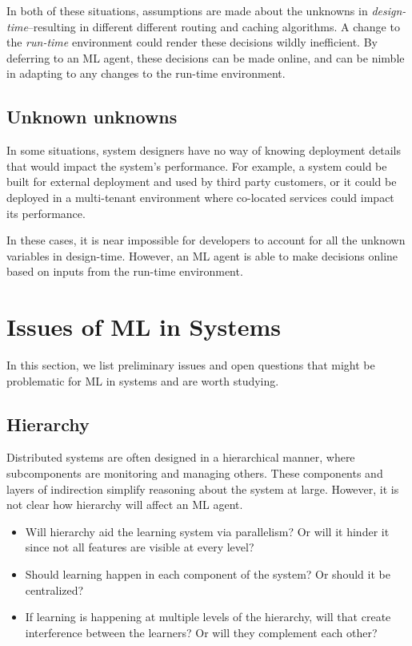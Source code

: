 \documentclass[a4paper,twocolumn]{article}
\begin{document}
In both of these situations, assumptions are made about the unknowns in
\emph{design-time}--resulting in different different routing and caching
algorithms. A change to the \emph{run-time} environment could render these
decisions wildly inefficient. By deferring to an ML agent, these decisions can
be made online, and can be nimble in adapting to any changes to the run-time
environment.

\subsection{Unknown unknowns}
In some situations, system designers have no way of knowing deployment details
that would impact the system's performance. For example, a system could be built
for external deployment and used by third party customers, or it could be
deployed in a multi-tenant environment where co-located services could impact
its performance.

In these cases, it is near impossible for developers to account for all the
unknown variables in design-time. However, an ML agent is able to make decisions
online based on inputs from the run-time environment.


\section{Issues of ML in Systems}

In this section, we list preliminary issues and open questions that might be
problematic for ML in systems and are worth studying.

\subsection{Hierarchy}
Distributed systems are often designed in a hierarchical manner, where
subcomponents are monitoring and managing others. These components and layers of
indirection simplify reasoning about the system at large. However, it is not
clear how hierarchy will affect an ML agent.
\begin{itemize}
  \item Will hierarchy aid the learning system via parallelism? Or will it hinder
    it since not all features are visible at every level?
  \item Should learning happen in each component of the system? Or should it be
    centralized?
  \item If learning is happening at multiple levels of the hierarchy, will that
    create interference between the learners? Or will they complement each
    other?
\end{itemize}
\end{document}
